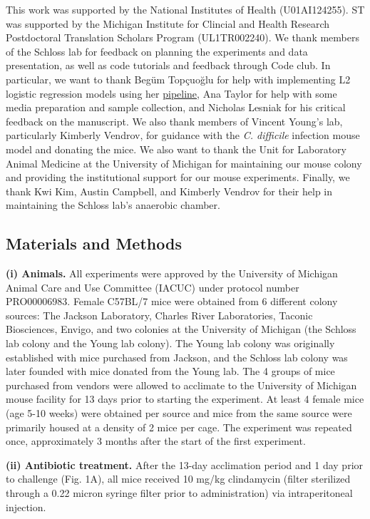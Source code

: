 \documentclass[11pt,]{article}
\begin{document}
This work was supported by the National Institutes of Health
(U01AI124255). ST was supported by the Michigan Institute for Clincial
and Health Research Postdoctoral Translation Scholars Program
(UL1TR002240). We thank members of the Schloss lab for feedback on
planning the experiments and data presentation, as well as code
tutorials and feedback through Code club. In particular, we want to
thank Begüm Topçuoğlu for help with implementing L2 logistic regression
models using her
\href{https://github.com/SchlossLab/ML_pipeline_microbiome}{pipeline},
Ana Taylor for help with some media preparation and sample collection,
and Nicholas Lesniak for his critical feedback on the manuscript. We
also thank members of Vincent Young's lab, particularly Kimberly
Vendrov, for guidance with the \emph{C. difficile} infection mouse model
and donating the mice. We also want to thank the Unit for Laboratory
Animal Medicine at the University of Michigan for maintaining our mouse
colony and providing the institutional support for our mouse
experiments. Finally, we thank Kwi Kim, Austin Campbell, and Kimberly
Vendrov for their help in maintaining the Schloss lab's anaerobic
chamber.

\newpage

\subsection{Materials and Methods}\label{materials-and-methods}

\textbf{(i) Animals.} All experiments were approved by the University of
Michigan Animal Care and Use Committee (IACUC) under protocol number
PRO00006983. Female C57BL/7 mice were obtained from 6 different colony
sources: The Jackson Laboratory, Charles River Laboratories, Taconic
Biosciences, Envigo, and two colonies at the University of Michigan (the
Schloss lab colony and the Young lab colony). The Young lab colony was
originally established with mice purchased from Jackson, and the Schloss
lab colony was later founded with mice donated from the Young lab. The 4
groups of mice purchased from vendors were allowed to acclimate to the
University of Michigan mouse facility for 13 days prior to starting the
experiment. At least 4 female mice (age 5-10 weeks) were obtained per
source and mice from the same source were primarily housed at a density
of 2 mice per cage. The experiment was repeated once, approximately 3
months after the start of the first experiment.

\textbf{(ii) Antibiotic treatment.} After the 13-day acclimation period
and 1 day prior to challenge (Fig. 1A), all mice received 10 mg/kg
clindamycin (filter sterilized through a 0.22 micron syringe filter
prior to administration) via intraperitoneal injection.
\end{document}
